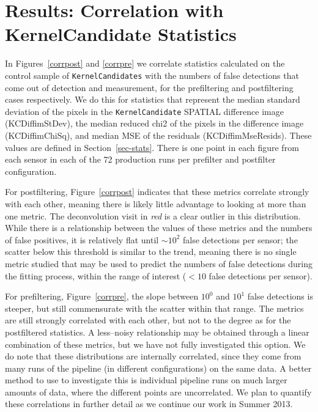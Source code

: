 \documentclass[prd, nofootinbib, floatfix, 11pt,tightenlines,times]{article}
\begin{document}
\section{Results: Correlation with KernelCandidate Statistics \label{sec-stats}}

In Figures~\ref{corrpost} and \ref{corrpre}  we correlate statistics
calculated on the control sample of {\tt KernelCandidates} with the
numbers of false detections that come out of detection and
measurement, for the prefiltering and postfiltering cases
respectively.  We do this for statistics that represent the median
standard deviation of the pixels in the {\tt KernelCandidate} SPATIAL
difference image (KCDiffimStDev), the median reduced chi2 of the
pixels in the difference image (KCDiffimChiSq), and median MSE of the
residuals (KCDiffimMseResids).  These values are defined in
Section~\ref{sec-stats}.  There is one point in each figure from each
sensor in each of the 72 production runs per prefilter and postfilter
configuration.

For postfiltering, Figure~\ref{corrpost} indicates that these metrics
correlate strongly with each other, meaning there is likely little
advantage to looking at more than one metric.  The deconvolution visit
in {\it red} is a clear outlier in this distribution.  While there is
a relationship between the values of these metrics and the numbers of
false positives, it is relatively flat until $\sim 10^2$ false
detections per sensor; the scatter below this threshold is similar to
the trend, meaning there is no single metric studied that may be used
to predict the numbers of false detections during the fitting process,
within the range of interest ($<10$ false detections per sensor).

For prefiltering, Figure~\ref{corrpre}, the slope between $10^0$ and
$10^1$ false detections is steeper, but still commensurate with the
scatter within that range.  The metrics are still strongly correlated
with each other, but not to the degree as for the postfiltered
statistics.  A less--noisy relationship may be obtained through a
linear combination of these metrics, but we have not fully
investigated this option.  
%
We do note that these distributions are internally correlated, since they come from many runs
of the pipeline (in different configurations) on the same data.  A better
method to use to investigate this is individual pipeline runs on much larger amounts of
data, where the different points are uncorrelated.
%
We plan to quantify
these correlations in further detail as we continue our work in Summer
2013.
\end{document}
